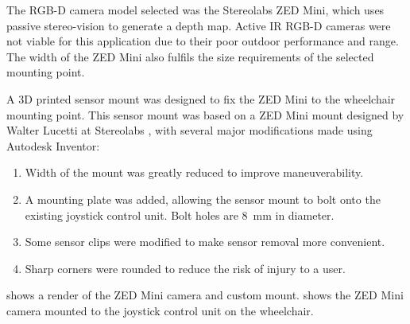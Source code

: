 The RGB-D camera model selected was the Stereolabs ZED Mini, which uses passive stereo-vision
to generate a depth map. Active IR RGB-D cameras were not viable for this application
due to their poor outdoor performance and range. The width of the ZED Mini also fulfils the
size requirements of the selected mounting point.


A 3D printed sensor mount was designed to fix the ZED Mini to the wheelchair mounting point.
This sensor mount was based on a ZED Mini mount designed by Walter Lucetti at Stereolabs \cite{lucettiStereolabsZEDMini2018},
with several major modifications made using Autodesk Inventor:
\begin{enumerate}[topsep=0pt,itemsep=-1ex,partopsep=1ex,parsep=1ex]
    \item Width of the mount was greatly reduced to improve maneuverability.
    \item A mounting plate was added, allowing the sensor mount to bolt onto
            the existing joystick control unit. Bolt holes are \SI{8}{\milli\metre} in diameter.
    \item Some sensor clips were modified to make sensor removal more convenient.
    \item Sharp corners were rounded to reduce the risk of injury to a user.
\end{enumerate}
 shows a render of the ZED Mini camera and custom mount.
 shows the ZED Mini camera mounted to the joystick control unit
on the wheelchair.

